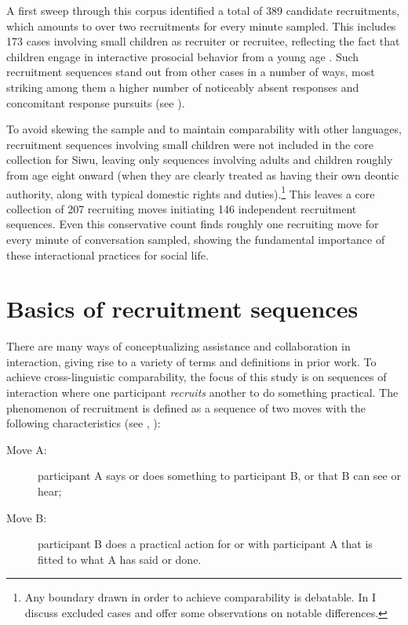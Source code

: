 \documentclass[output=paper]{langsci/langscibook}
\begin{document}
A first sweep through this corpus identified a total of 389 candidate recruitments, which amounts to over two recruitments for every minute sampled. This includes 173 cases involving small children as recruiter or recruitee, reflecting the fact that children engage in interactive prosocial behavior from a young age \citep{warneken_emergence_2013}. Such recruitment sequences stand out from other cases in a number of ways, most striking among them a higher number of noticeably absent responses and concomitant response pursuits (see ).

To avoid skewing the sample and to maintain comparability with other languages, recruitment sequences involving small children were not included in the core collection for Siwu, leaving only sequences involving adults and children roughly from age eight onward (when they are clearly treated as having their own deontic authority, along with typical domestic rights and duties).\footnote{Any boundary drawn in order to achieve comparability is debatable. In  I discuss excluded cases and offer some observations on notable differences.}  This leaves a core collection of 207 recruiting moves initiating 146 independent recruitment sequences. Even this conservative count finds roughly one recruiting move for every minute of conversation sampled, showing the fundamental importance of these interactional practices for social life.

\section{Basics of recruitment sequences}

There are many ways of conceptualizing assistance and collaboration in interaction, giving rise to a variety of terms and definitions in prior work. To achieve cross-linguistic comparability, the focus of this study is on sequences of interaction where one participant \textit{recruits} another to do something practical. The phenomenon of recruitment is defined as a sequence of two moves with the following characteristics (see , ):

\begin{description}
\item[Move A:] participant A says or does something to participant B, or that B can see or hear;
\item[Move B:] participant B does a practical action for or with participant A that is fitted to what A has said or done.
\end{description}
\end{document}
